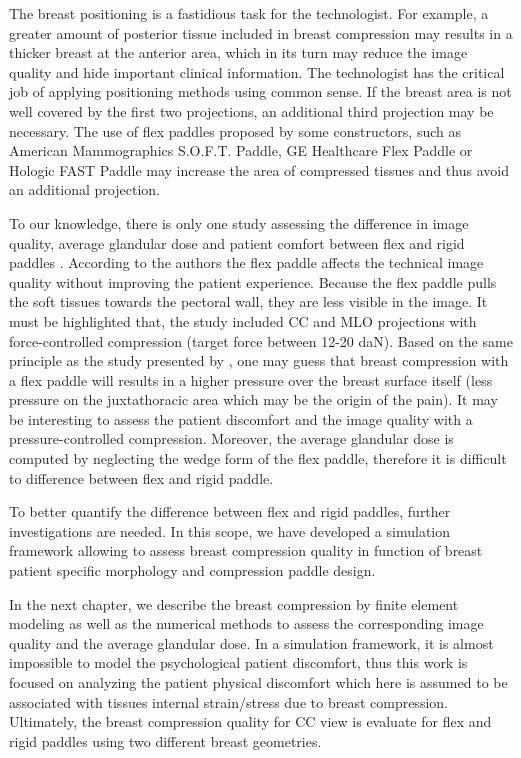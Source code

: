 The breast positioning is a fastidious task for the technologist. For example, a greater amount of posterior tissue included in breast compression may results in a thicker breast at the anterior area, which in its turn may reduce the image quality and hide important clinical information. The technologist has the critical job of applying positioning methods using common sense. If the breast area is not well covered by the first two projections, an additional third projection may be necessary. The use of flex paddles proposed by some constructors, such as American Mammographics S.O.F.T. Paddle, GE Healthcare Flex Paddle or Hologic FAST Paddle may increase the area of compressed tissues and thus avoid an additional projection.

To our knowledge, there is only one study assessing the difference in image quality, average glandular dose and patient comfort between flex and rigid paddles \citep{broeders_comparison_2015}. According to the authors the flex paddle affects the technical image quality without improving the patient experience.  Because the flex paddle pulls the soft tissues towards the pectoral wall, they are less visible in the image. It must be highlighted that, the study included CC and MLO projections with force-controlled compression (target force between 12-20 daN). Based on the same principle as the study presented by \cite{dustler_effect_2012}, one may guess that breast compression with a flex paddle will results in a higher pressure over the breast surface itself (less pressure on the juxtathoracic area which may be the origin of the pain). It may be interesting to assess the patient discomfort and the image quality with a pressure-controlled compression. Moreover, the average glandular dose is computed by neglecting the wedge form of the flex paddle, therefore it is difficult to difference between flex and rigid paddle.  

To better quantify the difference between flex and rigid paddles, further investigations are needed.  In this scope, we have developed a simulation framework allowing to assess breast compression quality in function of breast patient specific morphology and compression paddle design.

In the next chapter, we describe the breast compression by finite element modeling as well as the numerical methods to assess the corresponding image quality and the average glandular dose. In a simulation framework, it is almost impossible to model the psychological patient discomfort, thus this work is focused on analyzing the patient physical discomfort which here is assumed to be associated with tissues internal strain/stress due to breast compression. Ultimately, the breast compression quality for CC view is evaluate for flex and rigid paddles using two different breast geometries.
